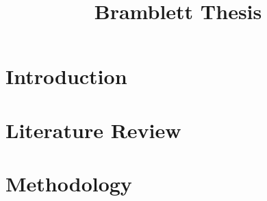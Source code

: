 \documentclass[12pt,letterpaper,oneside]{book}
\title{Bramblett Thesis}
\theoremstyle{definition}
\begin{document}
\frontmatter
	\flyleaf
    \disclaimerpage
    \titlepageAFIT
    \committeepage
    
    
    \tableofcontents
    \listoffigures
    \listoftables
\mainmatter
	\chapter{Introduction}
	
    \chapter{Literature Review}
    
    \chapter{Methodology}
    
\backmatter
	\singlespace
	
	 
	\clearpage
%
\end{document}
